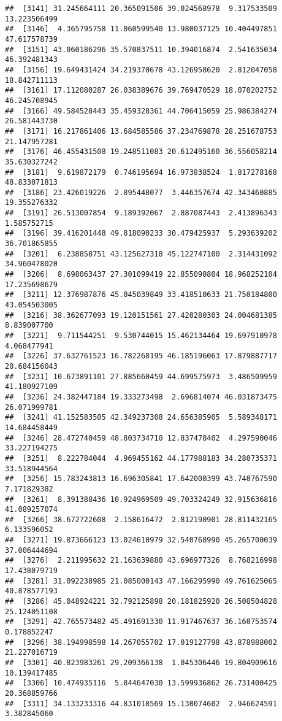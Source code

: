 \documentclass[
]{article}
\begin{document}
\begin{verbatim}
##  [3141] 31.245664111 20.365091506 39.024568978  9.317533509 13.223506499
##  [3146]  4.365795758 11.060599540 13.980037125 10.404497851 47.617578739
##  [3151] 43.060186296 35.570837511 10.394016874  2.541635034 46.392481343
##  [3156] 19.649431424 34.219370678 43.126958620  2.812047058 18.842711113
##  [3161] 17.112080287 26.038389676 39.769470529 18.070202752 46.245708945
##  [3166] 49.584528443 35.459328361 44.706415059 25.986384274 26.581443730
##  [3171] 16.217861406 13.684585586 37.234769878 28.251678753 21.147957281
##  [3176] 46.455431508 19.248511083 20.612495160 36.556058214 35.630327242
##  [3181]  9.619872179  0.746195694 16.973838524  1.817278168 48.833071813
##  [3186] 23.426019226  2.895448077  3.446357674 42.343460885 19.355276332
##  [3191] 26.513007854  9.189392067  2.887087443  2.413896343  1.585752715
##  [3196] 39.416201448 49.818090233 30.479425937  5.293639202 36.701865855
##  [3201]  6.238858751 43.125627318 45.122747100  2.314431092 34.960478020
##  [3206]  8.698063437 27.301099419 22.855090804 18.968252104 17.235698679
##  [3211] 12.376987876 45.045039849 33.418510633 21.750184800 43.054503005
##  [3216] 38.362677093 19.120151561 27.420280303 24.004681385  8.839007700
##  [3221]  9.711544251  9.530744015 15.462134464 19.697910978  4.068477941
##  [3226] 37.632761523 16.782268195 46.185196063 17.879887717 20.684156043
##  [3231] 10.673891101 27.885660459 44.699575973  3.486509959 41.180927109
##  [3236] 24.382447184 19.333273498  2.696814074 46.031873475 26.071999781
##  [3241] 41.152583505 42.349237308 24.656385905  5.589348171 14.684458449
##  [3246] 28.472740459 48.803734710 12.837478402  4.297590046 33.227194275
##  [3251]  8.222784044  4.969455162 44.177988183 34.280735371 33.518944564
##  [3256] 15.783243813 16.696305841 17.642000399 43.740767590  7.171829382
##  [3261]  8.391388436 10.924969509 49.703324249 32.915636816 41.089257074
##  [3266] 38.672722608  2.158616472  2.812190901 28.811432165  6.133596052
##  [3271] 19.873666123 13.024610979 32.540768990 45.265700039 37.006444694
##  [3276]  2.211995632 21.163639880 43.696977326  8.768216998 17.438079719
##  [3281] 31.092238985 21.085000143 47.166295990 49.761625065 40.878577193
##  [3286] 45.048924221 32.792125898 20.181825920 26.508504828 25.124051108
##  [3291] 42.765573482 45.491691330 11.917467637 36.160753574  0.178852247
##  [3296] 38.194998598 14.267055702 17.019127798 43.878988002 21.227016719
##  [3301] 40.823983261 29.209366138  1.045306446 19.804909616 10.139417485
##  [3306] 10.474935116  5.844647030 13.599936862 26.731400425 20.368859766
##  [3311] 34.133233316 44.831018569 15.130074602  2.946624591  3.382845060

\end{verbatim}
\end{document}
